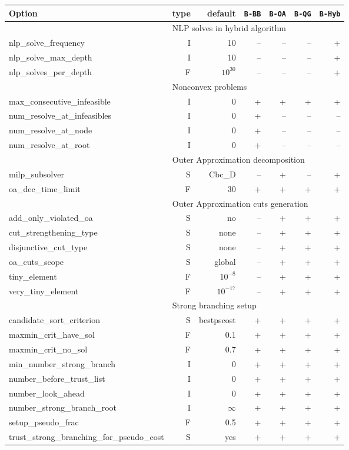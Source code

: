 \begin{center}
\begin{tabular}{|l|r|r|r|r|r|r|}\hline
Option & type &  default & {\tt B-BB} & {\tt B-OA} & {\tt B-QG} & {\tt B-Hyb} \\
\hline
\hline
\multicolumn{1}{|c}{} & \multicolumn{6}{l|}{NLP solves in hybrid algorithm}\\
\hline
nlp\_solve\_frequency& I& 10&--&--&--& +\\
nlp\_solve\_max\_depth& I& 10&--&--&--& +\\
nlp\_solves\_per\_depth& F& $10^{30}$&--&--&--& +\\
\hline
\multicolumn{1}{|c}{} & \multicolumn{6}{l|}{Nonconvex problems}\\
\hline
max\_consecutive\_infeasible& I& 0& +& +& +& +\\
num\_resolve\_at\_infeasibles& I& 0& +&--&--&--\\
num\_resolve\_at\_node& I& 0& +&--&--&--\\
num\_resolve\_at\_root& I& 0& +&--&--&--\\
\hline
\multicolumn{1}{|c}{} & \multicolumn{6}{l|}{Outer Approximation decomposition}\\
\hline
milp\_subsolver& S& Cbc\_D&--& +&--& +\\
oa\_dec\_time\_limit& F& 30& +& +& +& +\\
\hline
\multicolumn{1}{|c}{} & \multicolumn{6}{l|}{Outer Approximation cuts generation}\\
\hline
add\_only\_violated\_oa& S& no&--& +& +& +\\
cut\_strengthening\_type& S& none&--& +& +& +\\
disjunctive\_cut\_type& S& none&--& +& +& +\\
oa\_cuts\_scope& S& global&--& +& +& +\\
tiny\_element& F& $10^{-8}$&--& +& +& +\\
very\_tiny\_element& F& $10^{-17}$&--& +& +& +\\
\hline
\multicolumn{1}{|c}{} & \multicolumn{6}{l|}{Strong branching setup}\\
\hline
candidate\_sort\_criterion& S& best\-ps\-cost& +& +& +& +\\
maxmin\_crit\_have\_sol& F& 0.1& +& +& +& +\\
maxmin\_crit\_no\_sol& F& 0.7& +& +& +& +\\
min\_number\_strong\_branch& I& 0& +& +& +& +\\
number\_before\_trust\_list& I& 0& +& +& +& +\\
number\_look\_ahead& I& 0& +& +& +& +\\
number\_strong\_branch\_root& I& $\infty$& +& +& +& +\\
setup\_pseudo\_frac& F& 0.5& +& +& +& +\\
trust\_strong\_branching\_for\_pseudo\_cost& S& yes& +& +& +& +\\
\hline
\end{tabular}
\end{center}

